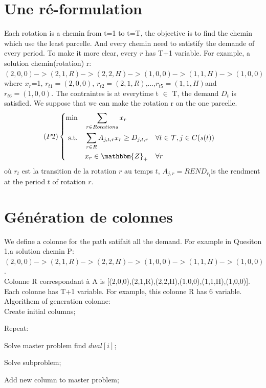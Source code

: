 \documentclass[a4paper]{article}
\begin{document}
\section{Une ré-formulation}
Each rotation is a chemin from t=1 to t=T, the objective is to find the chemin which use the least parcelle. And every chemin need to satistify the demande of every period. To make it more clear, every $r$ has T+1 variable. For example, a solution chemin(rotation) r: $(2,0,0)->(2,1,R)->(2,2,H)->(1,0,0)->(1,1,H)->(1,0,0)$ where $x_r$=1, $r_{t1}=(2,0,0)$,  $r_{t2}=(2,1,R)$,...,$r_{t5}=(1,1,H)$and $r_{t6}=(1,0,0)$. The contraintes is at everytime t $\in $ T, the demand $D_t$ is satisfied. We suppose that we can make the rotation r on the one parcelle.
\begin{equation*}
    (P2) \left\{ 
    \begin{aligned}
    \min\quad    & \sum_{r \in Rotations} x_{r}\\
   \text{s.t.\quad} & \sum_{r \in R} A_{j,t,r} x_{r} \geq D_{j,t,r} & & \forall t\in \mathcal{T}, j \in C(s(t))\\
                     & x_r \in \mathbbm{Z}_+            & & \forall r
  \end{aligned}
\right.
\end{equation*}
où $r_t$ est la transition de la rotation $r$ au temps $t$, $A_{j,r}={REND}_{r_t} $is the rendment at the period $t$ of rotation $r$. 

\section{Génération de colonnes}

We define a colonne for the path satifait all the demand. For example in Quesiton 1,a solution chemin P: $(2,0,0)->(2,1,R)->(2,2,H)->(1,0,0)->(1,1,H)->(1,0,0)$. \\
Colonne R correspondant à A is [(2,0,0),(2,1,R),(2,2,H),(1,0,0),(1,1,H),(1,0,0)]. Each colonne has T+1 variable. For example, this colonne R has 6 variable.
\\

		Algorithem of generation colonne:\\

		Create initial columns;
		
			Repeat:
			
					 Solve master problem find $dual[i]$;
					 
					 Solve subproblem;
					 
					 Add new column to master problem;
					 
\end{document}
